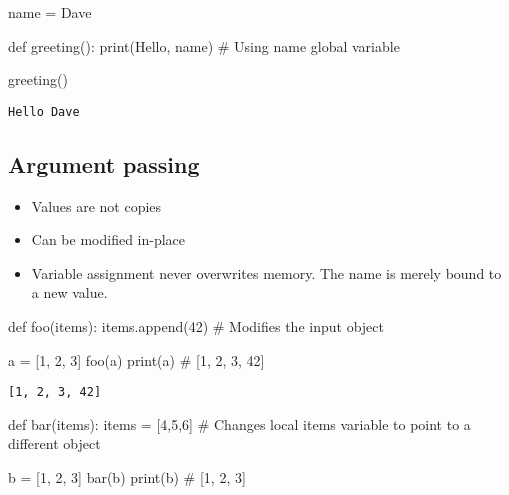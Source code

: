 \documentclass[
  letterpaper,
  DIV=11,
  numbers=noendperiod]{scrreprt}
\newenvironment{Shaded}{\begin{snugshade}}{\end{snugshade}}
\newcommand{\BuiltInTok}[1]{\textcolor[rgb]{0.00,0.46,0.62}{#1}}
\newcommand{\CommentTok}[1]{\textcolor[rgb]{0.37,0.37,0.37}{#1}}
\newcommand{\DecValTok}[1]{\textcolor[rgb]{0.68,0.00,0.00}{#1}}
\newcommand{\KeywordTok}[1]{\textcolor[rgb]{0.00,0.46,0.62}{#1}}
\newcommand{\NormalTok}[1]{\textcolor[rgb]{0.00,0.46,0.62}{#1}}
\newcommand{\OperatorTok}[1]{\textcolor[rgb]{0.37,0.37,0.37}{#1}}
\newcommand{\StringTok}[1]{\textcolor[rgb]{0.13,0.47,0.30}{#1}}
\providecommand{\tightlist}{%
  \setlength{\itemsep}{0pt}\setlength{\parskip}{0pt}}
\begin{document}
\begin{Shaded}
\begin{Highlighting}[]
\NormalTok{name }\OperatorTok{=} \StringTok{\textquotesingle{}Dave\textquotesingle{}}

\KeywordTok{def}\NormalTok{ greeting():}
    \BuiltInTok{print}\NormalTok{(}\StringTok{\textquotesingle{}Hello\textquotesingle{}}\NormalTok{, name)  }\CommentTok{\# Using \textasciigrave{}name\textasciigrave{} global variable}

\NormalTok{greeting()}
\end{Highlighting}
\end{Shaded}

\begin{verbatim}
Hello Dave
\end{verbatim}

\hypertarget{argument-passing}{%
\subsection{Argument passing}\label{argument-passing}}

\begin{itemize}
\tightlist
\item
  Values are not copies
\item
  Can be modified in-place
\item
  Variable assignment never overwrites memory. The name is merely bound
  to a new value.
\end{itemize}

\begin{Shaded}
\begin{Highlighting}[]
\KeywordTok{def}\NormalTok{ foo(items):}
\NormalTok{    items.append(}\DecValTok{42}\NormalTok{)    }\CommentTok{\# Modifies the input object}

\NormalTok{a }\OperatorTok{=}\NormalTok{ [}\DecValTok{1}\NormalTok{, }\DecValTok{2}\NormalTok{, }\DecValTok{3}\NormalTok{]}
\NormalTok{foo(a)}
\BuiltInTok{print}\NormalTok{(a)                }\CommentTok{\# [1, 2, 3, 42]}
\end{Highlighting}
\end{Shaded}

\begin{verbatim}
[1, 2, 3, 42]
\end{verbatim}

\begin{Shaded}
\begin{Highlighting}[]
\KeywordTok{def}\NormalTok{ bar(items):}
\NormalTok{    items }\OperatorTok{=}\NormalTok{ [}\DecValTok{4}\NormalTok{,}\DecValTok{5}\NormalTok{,}\DecValTok{6}\NormalTok{]    }\CommentTok{\# Changes local \textasciigrave{}items\textasciigrave{} variable to point to a different object}

\NormalTok{b }\OperatorTok{=}\NormalTok{ [}\DecValTok{1}\NormalTok{, }\DecValTok{2}\NormalTok{, }\DecValTok{3}\NormalTok{]}
\NormalTok{bar(b)}
\BuiltInTok{print}\NormalTok{(b)                }\CommentTok{\# [1, 2, 3]}
\end{Highlighting}
\end{Shaded}
\end{document}
